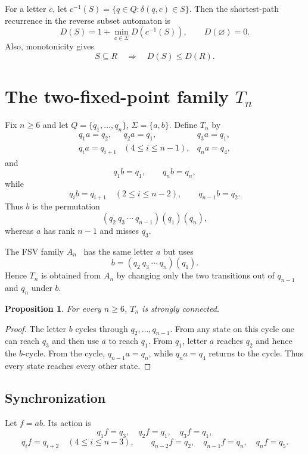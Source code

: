 \documentclass[11pt]{article}
\newtheorem{proposition}{Proposition}
\theoremstyle{definition}
\theoremstyle{remark}
\begin{document}
For a letter $c$, let $c^{-1}(S)=\{q\in Q:\delta(q,c)\in S\}$. Then the shortest-path recurrence in the reverse subset automaton is
\begin{equation}\label{eq:bellman}
 D(S)=1+\min_{c\in\Sigma}D(c^{-1}(S)),\qquad D(\varnothing)=0.
\end{equation}
Also, monotonicity gives
\begin{equation}\label{eq:mono}
 S\subseteq R\quad\Longrightarrow\quad D(S)\le D(R).
\end{equation}

\section{The two-fixed-point family \texorpdfstring{$T_n$}{Tn}}
Fix $n\ge6$ and let $Q=\{q_1,\ldots,q_n\}$, $\Sigma=\{a,b\}$. Define $T_n$ by
\[
\begin{array}{lll}
q_1a=q_2, & q_2a=q_1, & q_3a=q_1,\\
q_i a=q_{i+1} & (4\le i\le n-1), & q_na=q_4,
\end{array}
\]
and
\[
q_1b=q_1,\qquad q_nb=q_n,
\]
while
\[
q_i b=q_{i+1}\quad(2\le i\le n-2),\qquad q_{n-1}b=q_2.
\]
Thus $b$ is the permutation
\[
 (q_2\ q_3\ \cdots\ q_{n-1})(q_1)(q_n),
\]
whereas $a$ has rank $n-1$ and misses $q_3$.

The FSV family $A_n$~\cite{FSV2021} has the same letter $a$ but uses
\[
 b=(q_2\ q_3\ \cdots\ q_n)(q_1).
\]
Hence $T_n$ is obtained from $A_n$ by changing only the two transitions out of $q_{n-1}$ and $q_n$ under $b$.

\begin{proposition}\label{prop:sc}
For every $n\ge6$, $T_n$ is strongly connected.
\end{proposition}
\begin{proof}
The letter $b$ cycles through $q_2,\ldots,q_{n-1}$. From any state on this cycle one can reach $q_3$ and then use $a$ to reach $q_1$. From $q_1$, letter $a$ reaches $q_2$ and hence the $b$-cycle. From the cycle, $q_{n-1}a=q_n$, while $q_na=q_4$ returns to the cycle. Thus every state reaches every other state.
\end{proof}

\subsection{Synchronization}
Let $f=ab$. Its action is
\[
q_1f=q_3,\quad q_2f=q_1,\quad q_3f=q_1,
\]
\[
q_if=q_{i+2}\quad(4\le i\le n-3),\qquad
q_{n-2}f=q_2,\quad q_{n-1}f=q_n,\quad q_nf=q_5.
\]
\end{document}
